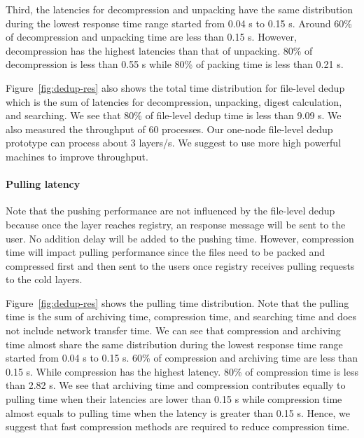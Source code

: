 Third, the latencies for decompression and unpacking have the same distribution during the lowest response time range started from 0.04 s to 0.15 s. Around 60\% of decompression and unpacking time are less than 0.15 s. However, decompression has the highest latencies than that of unpacking. 80\% of decompression is less than 0.55 s while 80\% of packing time is less than 0.21 s. 

Figure~\ref{fig:dedup-res} also shows the total time distribution for file-level dedup which is the sum of latencies for decompression, unpacking, digest calculation, and searching. We see that 80\% of file-level dedup time is less than 9.09 s. We also measured the throughput of 60 processes. Our one-node file-level dedup prototype can process about 3 layers/s. We suggest to use more high powerful machines to improve throughput.

\paragraph{Pulling latency}
Note that the pushing performance are not influenced by the file-level dedup because once the layer reaches registry, an response message will be sent to the user. No addition delay will be added to the pushing time. However, compression time will impact pulling performance since the files need to be packed and compressed first and then sent to the users once registry receives pulling requests to the cold layers. 

Figure~\ref{fig:dedup-res} shows the pulling time distribution. Note that the pulling time is the sum of archiving time, compression time, and searching time and does not include network transfer time. We can see that 
compression and archiving time almost share the same distribution during the lowest response time range started from 0.04 s to 0.15 s. 60\% of compression and archiving time are less than 0.15 s. While compression has the highest latency. 80\% of compression time is less than 2.82 s. We see that archiving time and compression contributes equally to pulling time when their latencies are lower than 0.15 s while compression time almost equals to pulling time when the latency is greater than 0.15 s. Hence, we suggest that fast compression methods are required to reduce compression time.  
 

